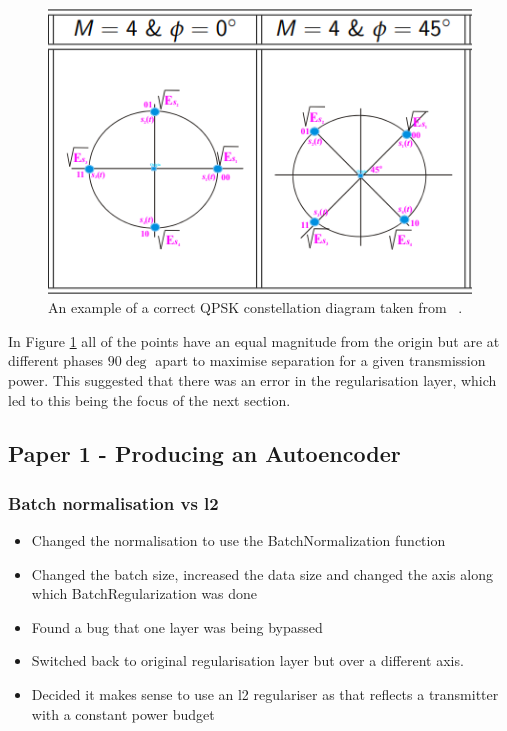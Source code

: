 \documentclass[12pt,onecolumn,letterpaper]{article}
\begin{document}
\begin{figure}[t]
\begin{center}
   \includegraphics[width=0.8\linewidth]{figures/EE3-03_comms_systems_qpsk_constellation_diagram.PNG}
\end{center}
   \caption{An example of a correct QPSK constellation diagram taken from ~\cite{EE3CommsSystemsNotesL4}. }
\label{fig:CommsSystemsConstelDiagEg}
\end{figure}

In Figure \ref{fig:CommsSystemsConstelDiagEg} all of the points have an equal magnitude from the origin but are at different phases $90\deg$ apart to maximise separation for a given transmission power. This suggested that there was an error in the regularisation layer, which led to this being the focus of the next section. 

\subsection{Paper 1 - Producing an Autoencoder}

\subsubsection{Batch normalisation vs l2}

\begin{itemize}
   \item Changed the normalisation to use the BatchNormalization function 
   \item Changed the batch size, increased the data size and changed the axis along which BatchRegularization was done
   \item Found a bug that one layer was being bypassed
   \item Switched back to original regularisation layer but over a different axis.
   \item Decided it makes sense to use an l2 regulariser as that reflects a transmitter with a constant power budget
\end{itemize}
\end{document}
